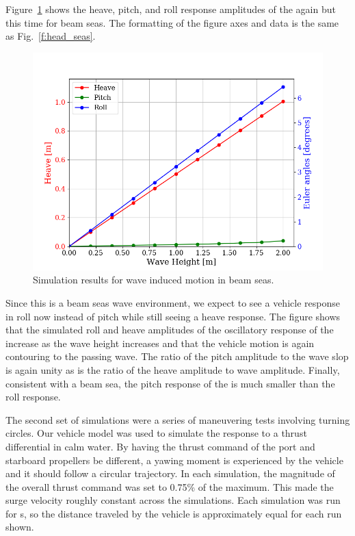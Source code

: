 \documentclass[utf8]{frontiersSCNS} %
\begin{document}
Figure~\ref{f:beam_seas} shows the heave, pitch, and roll response amplitudes of the \wamv{} again but this time for beam seas. The formatting of the figure axes and data is the same as Fig.~\ref{f:head_seas}.%
%
\begin{figure}[h]
  \centering
  \includegraphics[width=\SFc\textwidth]{src/2020_08_25_beam_seas_001.png}
  \caption{Simulation results for wave induced motion in beam seas.}
  \label{f:beam_seas}
\end{figure}
%
Since this is a beam seas wave environment, we expect to see a vehicle response in roll now instead of pitch while still seeing a heave response. The figure shows that the simulated roll and heave amplitudes of the oscillatory response of the \wamv{} increase as the wave height increases and that the vehicle motion is again contouring to the passing wave. The ratio of the pitch amplitude to the wave slop is again unity as is the ratio of the heave amplitude to wave amplitude. Finally, consistent with a beam sea, the pitch response of the \wamv{} is much smaller than the roll response.

The second set of simulations were a series of maneuvering tests involving turning circles. Our vehicle model was used to simulate the \wamv{} response to a thrust differential in calm water. By having the thrust command of the port and starboard propellers be different, a yawing moment is experienced by the vehicle and it should follow a circular trajectory. In each simulation, the magnitude of the overall thrust command was set to 0.75\% of the maximum. This made the surge velocity roughly constant across the simulations. Each simulation was run for \unit[60]{s}, so the distance traveled by the vehicle is approximately equal for each run shown.
\end{document}
